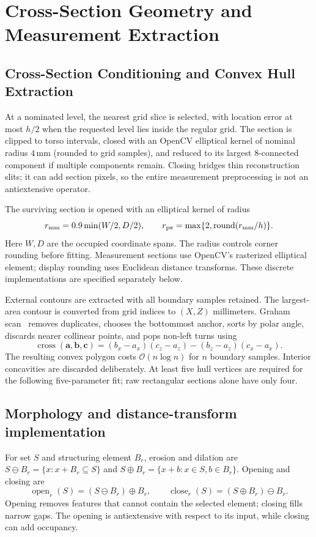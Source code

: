 \documentclass[11pt,a4paper]{article}
\numberwithin{equation}{section}
\begin{document}
\section{Cross-Section Geometry and Measurement Extraction}
\subsection{Cross-Section Conditioning and Convex Hull Extraction}
\label{subsec:shape_regularization}
\label{subsec:girth_extraction}
At a nominated level, the nearest grid slice is selected, with location error at most $h/2$ when the requested level lies inside the regular grid. The section is clipped to torso intervals, closed with an OpenCV elliptical kernel of nominal radius $4$\,mm (rounded to grid samples), and reduced to its largest 8-connected component if multiple components remain. Closing bridges thin reconstruction slits; it can add section pixels, so the entire measurement preprocessing is not an antiextensive operator.

The surviving section is opened with an elliptical kernel of radius
\begin{equation}
r_{\rm mm}=0.9\min(W/2,D/2),\qquad
r_{\rm px}=\max\{2,\operatorname{round}(r_{\rm mm}/h)\}.
\label{eq:disk_radius}
\end{equation}
Here $W,D$ are the occupied coordinate spans. The radius controls corner rounding before fitting. Measurement sections use OpenCV's rasterized elliptical element; display rounding uses Euclidean distance transforms. These discrete implementations are specified separately below.

External contours are extracted with all boundary samples retained. The largest-area contour is converted from grid indices to $(X,Z)$ millimeters. Graham scan~\cite{graham1972efficient} removes duplicates, chooses the bottommost anchor, sorts by polar angle, discards nearer collinear points, and pops non-left turns using
\begin{equation}
\operatorname{cross}(\mathbf a,\mathbf b,\mathbf c)
=(b_x-a_x)(c_z-a_z)-(b_z-a_z)(c_x-a_x).
\end{equation}
The resulting convex polygon costs $\mathcal O(n\log n)$ for $n$ boundary samples. Interior concavities are discarded deliberately. At least five hull vertices are required for the following five-parameter fit; raw rectangular sections alone have only four.

\subsection{Morphology and distance-transform implementation}
For set $S$ and structuring element $B_r$, erosion and dilation are $S\ominus B_r=\{x:x+B_r\subseteq S\}$ and $S\oplus B_r=\{x+b:x\in S,b\in B_r\}$. Opening and closing are
\begin{equation}
\operatorname{open}_r(S)=(S\ominus B_r)\oplus B_r,\qquad
\operatorname{close}_r(S)=(S\oplus B_r)\ominus B_r.
\end{equation}
Opening removes features that cannot contain the selected element; closing fills narrow gaps. The opening is antiextensive with respect to its input, while closing can add occupancy.
\end{document}
